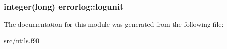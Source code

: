 \hypertarget{classerrorlog_adb26bb2d10f764e895c9745c3fb5dd1d}{
\subsubsection[{logunit}]{\setlength{\rightskip}{0pt plus 5cm}integer(long) errorlog\-::logunit\hspace{0.3cm}{\ttfamily [private]}}}\label{classerrorlog_adb26bb2d10f764e895c9745c3fb5dd1d}


The documentation for this module was generated from the following file\-:\begin{DoxyCompactItemize}
\item 
src/\hyperlink{utils_8f90}{utils.\-f90}\end{DoxyCompactItemize}
